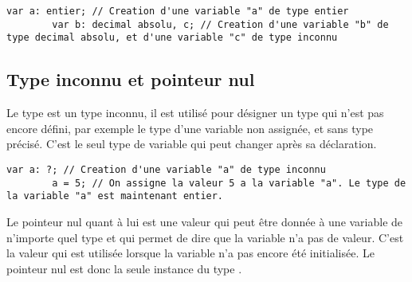\documentclass[../userguide.tex]{subfiles}
\begin{document}
    \begin{lstlisting}[label={lst:var-type-ex-1}]
        var a: entier; // Creation d'une variable "a" de type entier
        var b: decimal absolu, c; // Creation d'une variable "b" de type decimal absolu, et d'une variable "c" de type inconnu
    \end{lstlisting}

    \subsection{Type inconnu et pointeur nul} \label{subsec:type-inconnu-et-pointeur-nul}
    \parindent
    Le type  est un type inconnu, il est utilisé pour désigner un type qui n'est pas encore défini, par
    exemple le type d'une variable non assignée, et sans type précisé.
    C'est le seul type de variable qui peut changer après sa déclaration.

    \begin{lstlisting}[label={lst:var-type-ex-2}]
        var a: ?; // Creation d'une variable "a" de type inconnu
        a = 5; // On assigne la valeur 5 a la variable "a". Le type de la variable "a" est maintenant entier.
    \end{lstlisting}

    Le pointeur nul quant à lui est une valeur qui peut être donnée à une variable de n'importe quel type et qui
    permet de dire que la variable n'a pas de valeur.
    C'est la valeur qui est utilisée lorsque la variable n'a pas encore été initialisée.
    Le pointeur nul est donc la seule instance du type .
\end{document}
